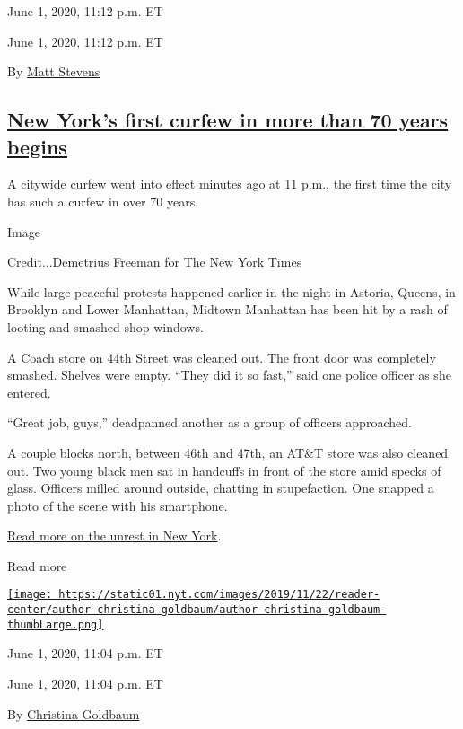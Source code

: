 June 1, 2020, 11:12 p.m. ET

June 1, 2020, 11:12 p.m. ET

By \href{https://www.nytimes.com/by/matt-stevens}{Matt Stevens}

\hypertarget{new-yorks-first-curfew-in-more-than-70-years-begins}{%
\subsection{\texorpdfstring{\protect\hyperlink{new-yorks-first-curfew-in-more-than-70-years-begins}{New
York's first curfew in more than 70 years
begins}}{New York's first curfew in more than 70 years begins}}\label{new-yorks-first-curfew-in-more-than-70-years-begins}}

A citywide curfew went into effect minutes ago at 11 p.m., the first
time the city has such a curfew in over 70 years.

Image

Credit...Demetrius Freeman for The New York Times

While large peaceful protests happened earlier in the night in Astoria,
Queens, in Brooklyn and Lower Manhattan, Midtown Manhattan has been hit
by a rash of looting and smashed shop windows.

A Coach store on 44th Street was cleaned out. The front door was
completely smashed. Shelves were empty. ``They did it so fast,'' said
one police officer as she entered.

``Great job, guys,'' deadpanned another as a group of officers
approached.

A couple blocks north, between 46th and 47th, an AT\&T store was also
cleaned out. Two young black men sat in handcuffs in front of the store
amid specks of glass. Officers milled around outside, chatting in
stupefaction. One snapped a photo of the scene with his smartphone.

\href{https://www.nytimes.com/2020/06/01/nyregion/nyc-protests-george-floyd.html}{Read
more on the unrest in New York}.

Read more

\href{https://www.nytimes.com/by/christina-goldbaum}{\texttt{[image: https://static01.nyt.com/images/2019/11/22/reader-center/author-christina-goldbaum/author-christina-goldbaum-thumbLarge.png]}}

June 1, 2020, 11:04 p.m. ET

June 1, 2020, 11:04 p.m. ET

By \href{https://www.nytimes.com/by/christina-goldbaum}{Christina
Goldbaum}

